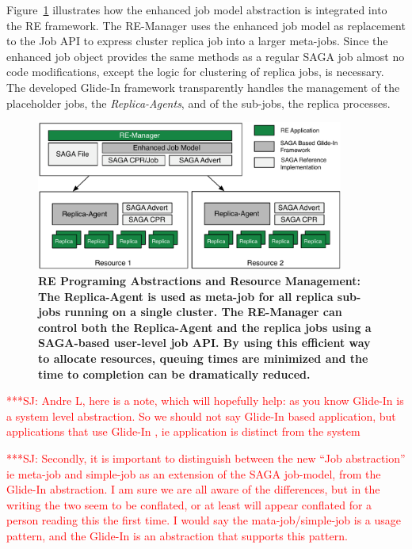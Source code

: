 \documentclass{rspublic}
\newcommand{\jhanote}[1]{ {\textcolor{red} { ***SJ: #1 }}}
\newcommand{\jhanote}[1]{}
\newcommand{\glidein}[1]{Glide-In }
\newcommand{\replicaagent}[1]{Replica-Agent }
\newcommand{\remanager}[1]{RE-Manager }
\begin{document}
Figure~\ref{fig:remdmanager_v1.1} illustrates how the enhanced job model abstraction is integrated
into the RE framework. The \remanager\  uses the enhanced job model as replacement to the Job API
to express cluster replica job into a larger meta-jobs. Since the enhanced job object provides the same methods
as a regular SAGA job almost no code modifications, except the logic for clustering of replica jobs, 
is necessary. The developed \glidein\ framework transparently handles the management of the placeholder jobs, 
the \textit{Replica-Agents}, and of the sub-jobs, the replica processes. 


\begin{figure}[t]
    \centering
    \includegraphics[width=0.9\textwidth]{remdmanager_v11}
    \caption{\footnotesize \bf RE Programing Abstractions and
      Resource Management: The Replica-Agent is used as meta-job for
      all replica sub-jobs running on a single cluster. The
      \remanager\ can control both the \replicaagent\ and the replica
      jobs using a SAGA-based user-level job API. By using this
      efficient way to allocate resources, queuing times are minimized
      and the time to completion can be dramatically reduced.}
    \label{fig:remdmanager_v1.1}
\end{figure}

\jhanote{Andre L, here is a note, which will hopefully help: as you
  know \glidein\ is a system level abstraction. So we should not say
  \glidein\ based application, but applications that use \glidein\ ,
  ie application is distinct from the system}

\jhanote{Secondly, it is important to distinguish between the new
  ``Job abstraction'' ie meta-job and simple-job as an extension of
  the SAGA job-model, from the \glidein\ abstraction. I am sure we are
  all aware of the differences, but in the writing the two seem to be
  conflated, or at least will appear conflated for a person reading
  this the first time. I would say the mata-job/simple-job is a usage
  pattern, and the \glidein\ is an abstraction that supports this
  pattern.}
\end{document}
